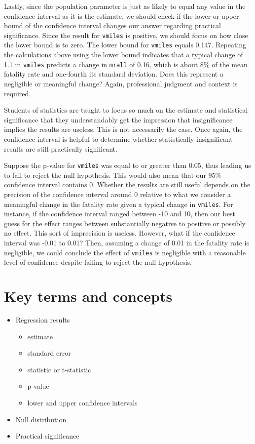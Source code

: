 \documentclass[
]{book}
\providecommand{\tightlist}{%
  \setlength{\itemsep}{0pt}\setlength{\parskip}{0pt}}
\begin{document}
Lastly, since the population parameter is just as likely to equal any value in the confidence interval as it is the estimate, we should check if the lower or upper bound of the confidence interval changes our answer regarding practical significance. Since the result for \texttt{vmiles} is positive, we should focus on how close the lower bound is to zero. The lower bound for \texttt{vmiles} equals 0.147. Repeating the calculations above using the lower bound indicates that a typical change of 1.1 in \texttt{vmiles} predicts a change in \texttt{mrall} of 0.16, which is about 8\% of the mean fatality rate and one-fourth its standard deviation. Does this represent a negligible or meaningful change? Again, professional judgment and context is required.

Students of statistics are taught to focus so much on the estimate and statistical significance that they understandably get the impression that insignificance implies the results are useless. This is not necessarily the case. Once again, the confidence interval is helpful to determine whether statistically insignificant results are still practically significant.

Suppose the p-value for \texttt{vmiles} was equal to or greater than 0.05, thus leading us to fail to reject the null hypothesis. This would also mean that our 95\% confidence interval contains 0. Whether the results are still useful depends on the precision of the confidence interval around 0 relative to what we consider a meaningful change in the fatality rate given a typical change in \texttt{vmiles}. For instance, if the confidence interval ranged between -10 and 10, then our best guess for the effect ranges between substantially negative to positive or possibly no effect. This sort of imprecision is useless. However, what if the confidence interval was -0.01 to 0.01? Then, assuming a change of 0.01 in the fatality rate is negligible, we could conclude the effect of \texttt{vmiles} is negligible with a reasonable level of confidence despite failing to reject the null hypothesis.

\hypertarget{kt12}{%
\section{Key terms and concepts}\label{kt12}}

\begin{itemize}
\tightlist
\item
  Regression results

  \begin{itemize}
  \tightlist
  \item
    estimate
  \item
    standard error
  \item
    statistic or t-statistic
  \item
    p-value
  \item
    lower and upper confidence intervals
  \end{itemize}
\item
  Null distribution
\item
  Practical significance
\end{itemize}
\end{document}
